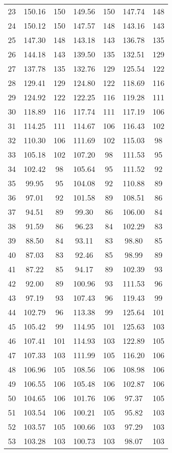 \begin{center}
\begin{longtable}{lcccccc}
    23 &150.16&150&149.56&150&147.74&148 \\
    24 &150.12&150&147.57&148&143.16&143 \\
    25 &147.30&148&143.18&143&136.78&135 \\
    26 &144.18&143&139.50&135&132.51&129 \\
    27 &137.78&135&132.76&129&125.54&122 \\
    28 &129.41&129&124.80&122&118.69&116 \\
    29 &124.92&122&122.25&116&119.28&111 \\
    30 &118.89&116&117.74&111&117.19&106 \\
    31 &114.25&111&114.67&106&116.43&102 \\
    32 &110.30&106&111.69&102&115.03& 98 \\
    33 &105.18&102&107.20& 98&111.53& 95 \\
    34 &102.42& 98&105.64& 95&111.52& 92 \\
    35 & 99.95& 95&104.08& 92&110.88& 89 \\
    36 & 97.01& 92&101.58& 89&108.51& 86 \\
    37 & 94.51& 89& 99.30& 86&106.00& 84 \\
    38 & 91.59& 86& 96.23& 84&102.29& 83 \\
    39 & 88.50& 84& 93.11& 83& 98.80& 85 \\
    40 & 87.03& 83& 92.46& 85& 98.99& 89 \\
    41 & 87.22& 85& 94.17& 89&102.39& 93 \\
    42 & 92.00& 89&100.96& 93&111.53& 96 \\
    43 & 97.19& 93&107.43& 96&119.43& 99 \\
    44 &102.79& 96&113.38& 99&125.64&101 \\
    45 &105.42& 99&114.95&101&125.63&103 \\
    46 &107.41&101&114.93&103&122.89&105 \\
    47 &107.33&103&111.99&105&116.20&106 \\
    48 &106.96&105&108.56&106&108.98&106 \\
    49 &106.55&106&105.48&106&102.87&106 \\
    50 &104.65&106&101.76&106& 97.37&105 \\
    51 &103.54&106&100.21&105& 95.82&103 \\
    52 &103.57&105&100.66&103& 97.29&103 \\
    53 &103.28&103&100.73&103& 98.07&103 \\

\end{longtable}
\end{center}
